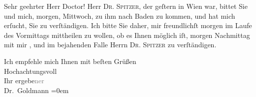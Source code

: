 \pstart\center{}Sehr geehrter Herr Doctor!\pend\vspace{0.5em}
\pstart
           Herr \textsc{Dr. Spitzer}, der geſtern in Wien war, bittet Sie und mich, morgen, Mittwoch, zu ihm nach Baden zu kommen,
               und hat mich erſucht, Sie zu verſtändigen. Ich bitte Sie daher, mir freundlichſt
                  morgen im Laufe des Vormittags
               mittheilen zu {\pb}wollen, ob es Ihnen möglich iſt,
                  morgen{ }Nachmittag mit mir \label{K_L02641-1v}\label{K_L02641-1}, und im bejahenden Falle Herrn \textsc{Dr. Spitzer} zu verſtändigen.\pend
           
\pstart
           Ich empfehle mich Ihnen mit beſten Grüßen {\\[\baselineskip]}Hochachtungsvoll {\\[\baselineskip]}Ihr
                  ergebe\textcolor{gray}{ner}{\\[\baselineskip]}\spacefill\mbox{Dr. Goldmann}\pend
           \leftskip=0em{}\endnumbering{}  \newcommand{\dateiname}{L02641}\newcommand{\titel}{Paul Goldmann an Arthur Schnitzler, 25. 6. 1889}\newcommand{\editorInnen}{Martin Anton Müller und Laura Untner}
